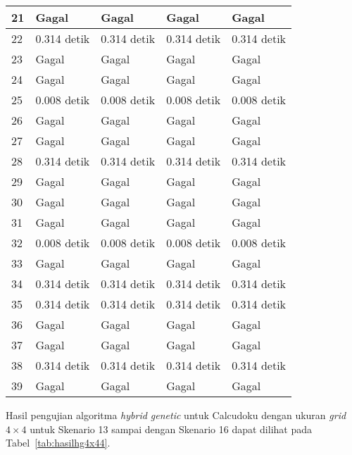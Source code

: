 \begin{table}
\begin{tabular}{| l | l | l | l | l |}
\hline
21 & Gagal & Gagal & Gagal & Gagal \\
\hline
22 & 0.314 detik & 0.314 detik & 0.314 detik & 0.314 detik \\
\hline
23 & Gagal & Gagal & Gagal & Gagal \\
\hline
24 & Gagal & Gagal & Gagal & Gagal \\
\hline
25 & 0.008 detik & 0.008 detik & 0.008 detik & 0.008 detik \\
\hline
26 & Gagal & Gagal & Gagal & Gagal \\
\hline
27 & Gagal & Gagal & Gagal & Gagal \\
\hline
28 & 0.314 detik & 0.314 detik & 0.314 detik & 0.314 detik \\
\hline
29 & Gagal & Gagal & Gagal & Gagal \\
\hline
30 & Gagal & Gagal & Gagal & Gagal \\
\hline
31 & Gagal & Gagal & Gagal & Gagal \\
\hline
32 & 0.008 detik & 0.008 detik & 0.008 detik & 0.008 detik \\
\hline
33 & Gagal & Gagal & Gagal & Gagal \\
\hline
34 & 0.314 detik & 0.314 detik & 0.314 detik & 0.314 detik \\
\hline
35 & 0.314 detik & 0.314 detik & 0.314 detik & 0.314 detik \\
\hline
36 & Gagal & Gagal & Gagal & Gagal \\
\hline
37 & Gagal & Gagal & Gagal & Gagal \\
\hline
38 & 0.314 detik & 0.314 detik & 0.314 detik & 0.314 detik \\
\hline
39 & Gagal & Gagal & Gagal & Gagal \\
\hline
\end{tabular}
\label{tab:hasilhg4x43}
\end{table}

Hasil pengujian algoritma \textit{hybrid genetic} untuk Calcudoku dengan ukuran \textit{grid} \begin{math}4 \times 4\end{math} untuk Skenario 13 sampai dengan Skenario 16 dapat dilihat pada Tabel~\ref{tab:hasilhg4x44}.

